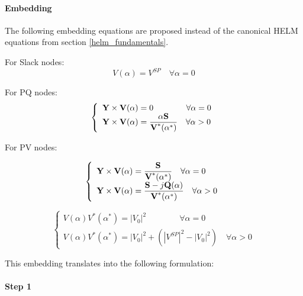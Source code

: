 \documentclass[a4paper,twoside,fleqn]{tufte-book}
\begin{document}
\paragraph{Embedding}

The following embedding equations are proposed instead of the canonical HELM equations from section \ref{helm_fundamentals}.

For Slack nodes:
\begin{equation}
V(\alpha) = V^{SP} \quad \forall \alpha=0
\end{equation}

For PQ nodes:
\begin{equation}
\left\{
\begin{array}{ll}
\textbf{Y} \times \textbf{V}(\alpha) = 0 \quad \quad \quad \quad \forall \alpha=0\\
\mathlarger{\textbf{Y} \times \textbf{V}(\alpha) = \frac{\alpha \textbf{S}}{\textbf{V}^*(\alpha^*)}} \quad \forall \alpha>0
\end{array}
\right.
\end{equation}

For PV nodes:

\begin{equation}
\left\{
\begin{array}{ll}
\mathlarger{\textbf{Y} \times \textbf{V}(\alpha) = \frac{ \textbf{S}}{\textbf{V}^*(\alpha^*)}} \quad \forall \alpha=0\\
\mathlarger{\textbf{Y} \times \textbf{V}(\alpha) = \frac{ \textbf{S} - j \textbf{Q}(\alpha)}{\textbf{V}^*(\alpha^*)}} \quad \forall \alpha>0
\end{array}
\right.
\end{equation}

\begin{equation}
\left\{
\begin{array}{ll}
V(\alpha)V^*(\alpha^*) = |V_0|^2\quad \quad \quad \quad \forall \alpha=0\\
V(\alpha)V^*(\alpha^*) = |V_0|^2 + (|V^{SP}|^2-|V_0|^2) \quad \forall \alpha>0
\end{array}
\right.
\end{equation}




This embedding translates into the following formulation:

\paragraph{Step 1}
\end{document}
